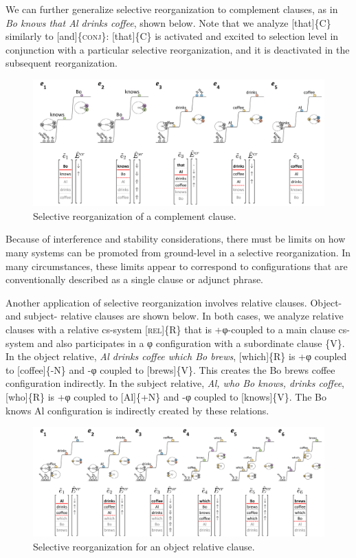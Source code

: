  We can further generalize selective reorganization to complement clauses, as in \textit{Bo knows that Al drinks coffee}, shown below. Note that we analyze [that]\{C\} similarly to [and]\{\textsc{conj}\}: [that]\{C\} is activated and excited to selection level in conjunction with a particular selective reorganization, and it is deactivated in the subsequent reorganization. 

  
\begin{figure}
\includegraphics[width=\textwidth]{figures/Tilsen-img101.png}
\caption{Selective reorganization of a complement clause.}
\label{fig:4:51}
\end{figure}
 

  Because of interference and stability considerations, there must be limits on how many systems can be promoted from ground-level in a selective reorganization. In many circumstances, these limits appear to correspond to configurations that are conventionally described as a single clause or adjunct phrase.

  Another application of selective reorganization involves relative clauses. Object- and subject- relative clauses are shown below. In both cases, we analyze relative clauses with a relative cs-system [\textsc{rel}]\{R\} that is +φ-coupled to a main clause cs-system and also participates in a φ configuration with a subordinate clause \{V\}. In the object relative, \textit{Al drinks coffee which Bo brews}, [which]\{R\} is +φ coupled to [coffee]\{-N\} and -φ coupled to [brews]\{V\}. This creates the {\textbar}Bo brews coffee{\textbar} configuration indirectly. In the subject relative, \textit{Al, who Bo knows, drinks coffee}, [who]\{R\} is +φ coupled to [Al]\{+N\} and -φ coupled to [knows]\{V\}. The {\textbar}Bo knows Al{\textbar} configuration is indirectly created by these relations.

  
\begin{figure}
\includegraphics[width=\textwidth]{figures/Tilsen-img102.png}
\caption{Selective reorganization for an object relative clause.}
\label{fig:4:52}
\end{figure}
 

